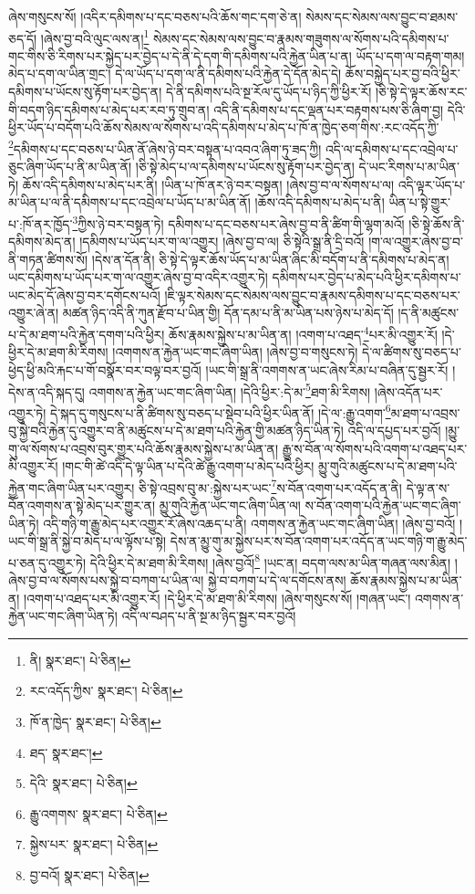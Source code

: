 ཞེས་གསུངས་སོ། །འདིར་དམིགས་པ་དང་བཅས་པའི་ཆོས་གང་དག་ཅེ་ན། སེམས་དང་སེམས་ལས་བྱུང་བ་ཐམས་ཅད་དོ། །ཞེས་བྱ་བའི་ལུང་ལས་ན།\footnote{ནི།  སྣར་ཐང་།  པེ་ཅིན། } སེམས་དང་སེམས་ལས་བྱུང་བ་རྣམས་གཟུགས་ལ་སོགས་པའི་དམིགས་པ་གང་གིས་ཅི་རིགས་པར་སྐྱེད་པར་བྱེད་པ་དེ་ནི་དེ་དག་གི་དམིགས་པའི་རྐྱེན་ཡིན་པ་ན། ཡོད་པ་དག་ལ་བརྟག་གམ། མེད་པ་དག་ལ་ཡིན་གྲང་། དེ་ལ་ཡོད་པ་དག་ལ་ནི་དམིགས་པའི་རྐྱེན་དེ་དོན་མེད་དེ། ཆོས་བསྐྱེད་པར་བྱ་བའི་ཕྱིར་དམིགས་པ་ཡོངས་སུ་རྟོག་པར་བྱེད་ན། དེ་ནི་དམིགས་པའི་སྔ་རོལ་དུ་ཡོད་པ་ཉིད་ཀྱི་ཕྱིར་རོ། །ཅི་སྟེ་དེ་ལྟར་ཆོས་རང་གི་བདག་ཉིད་དམིགས་པ་མེད་པར་རབ་ཏུ་གྲུབ་ན། འདི་ནི་དམིགས་པ་དང་ལྡན་པར་བརྟགས་པས་ཅི་ཞིག་བྱ། དེའི་ཕྱིར་ཡོད་པ་བདོག་པའི་ཆོས་སེམས་ལ་སོགས་པ་འདི་དམིགས་པ་མེད་པ་ཁོ་ན་ཁྱེད་ཅག་གིས་:རང་འདོད་ཀྱི་\footnote{རང་འདོད་ཀྱིས་  སྣར་ཐང་།  པེ་ཅིན། }དམིགས་པ་དང་བཅས་པ་ཡིན་ནོ་ཞེས་ཉེ་བར་བསྟན་པ་འབའ་ཞིག་ཏུ་ཟད་ཀྱི། འདི་ལ་དམིགས་པ་དང་འབྲེལ་པ་ཅུང་ཞིག་ཡོད་པ་ནི་མ་ཡིན་ནོ། །ཅི་སྟེ་མེད་པ་ལ་དམིགས་པ་ཡོངས་སུ་རྟོག་པར་བྱེད་ན། དེ་ཡང་རིགས་པ་མ་ཡིན་ཏེ། ཆོས་འདི་དམིགས་པ་མེད་པར་ནི། །ཡིན་པ་ཁོ་ནར་ཉེ་བར་བསྟན། །ཞེས་བྱ་བ་ལ་སོགས་པ་ལ། འདི་ལྟར་ཡོད་པ་མ་ཡིན་པ་ལ་ནི་དམིགས་པ་དང་འབྲེལ་པ་ཡོད་པ་མ་ཡིན་ནོ། །ཆོས་འདི་དམིགས་པ་མེད་པ་ནི། ཡིན་པ་སྟེ་གྱུར་པ་:ཁོ་ནར་ཁྱོད་\footnote{ཁོ་ན་ཁྱེད་  སྣར་ཐང་།  པེ་ཅིན། }ཀྱིས་ཉེ་བར་བསྟན་ཏེ། དམིགས་པ་དང་བཅས་པར་ཞེས་བྱ་བ་ནི་ཚིག་གི་ལྷག་མའོ། །ཅི་སྟེ་ཆོས་ནི་དམིགས་མེད་ན། །དམིགས་པ་ཡོད་པར་ག་ལ་འགྱུར། །ཞེས་བྱ་བ་ལ། ཅི་སྟེའི་སྒྲ་ནི་དྲི་བའོ། །ག་ལ་འགྱུར་ཞེས་བྱ་བ་ནི་གཏན་ཚིགས་སོ། །དེས་ན་དོན་ནི། ཅི་སྟེ་དེ་ལྟར་ཆོས་ཡོད་པ་མ་ཡིན་ཞིང་མི་བདོག་པ་ནི་དམིགས་པ་མེད་ན། ཡང་དམིགས་པ་ཡོད་པར་ག་ལ་འགྱུར་ཞེས་བྱ་བ་འདིར་འགྱུར་ཏེ། དམིགས་པར་བྱེད་པ་མེད་པའི་ཕྱིར་དམིགས་པ་ཡང་མེད་དོ་ཞེས་བྱ་བར་དགོངས་པའོ། །ཇི་ལྟར་སེམས་དང་སེམས་ལས་བྱུང་བ་རྣམས་དམིགས་པ་དང་བཅས་པར་འགྱུར་ཞེ་ན། མཚན་ཉིད་འདི་ནི་ཀུན་རྫོབ་པ་ཡིན་གྱི། དོན་དམ་པ་ནི་མ་ཡིན་པས་ཉེས་པ་མེད་དོ། །ད་ནི་མཚུངས་པ་དེ་མ་ཐག་པའི་རྐྱེན་དགག་པའི་ཕྱིར། ཆོས་རྣམས་སྐྱེས་པ་མ་ཡིན་ན། །འགག་པ་འཐད་\footnote{ཐད་  སྣར་ཐང་། }པར་མི་འགྱུར་རོ། །དེ་ཕྱིར་དེ་མ་ཐག་མི་རིགས། །འགགས་ན་རྐྱེན་ཡང་གང་ཞིག་ཡིན། །ཞེས་བྱ་བ་གསུངས་ཏེ། དེ་ལ་ཚིགས་སུ་བཅད་པ་ཕྱེད་ཕྱི་མའི་རྐང་པ་གོ་བསྣོར་བར་བལྟ་བར་བྱའོ། །ཡང་གི་སྒྲ་ནི་འགགས་ན་ཡང་ཞེས་རིམ་པ་བཞིན་དུ་སྦྱར་རོ། །དེས་ན་འདི་སྐད་དུ། འགགས་ན་རྐྱེན་ཡང་གང་ཞིག་ཡིན། །དེའི་ཕྱིར་:དེ་མ་\footnote{དེའི་  སྣར་ཐང་།  པེ་ཅིན། }ཐག་མི་རིགས། །ཞེས་འདོན་པར་འགྱུར་ཏེ། དེ་སྐད་དུ་གསུངས་པ་ནི་ཚིགས་སུ་བཅད་པ་སྡེབ་པའི་ཕྱིར་ཡིན་ནོ། །དེ་ལ་:རྒྱུ་འགག་\footnote{རྒྱུ་འགགས་  སྣར་ཐང་།  པེ་ཅིན། }མ་ཐག་པ་འབྲས་བུ་སྐྱེ་བའི་རྐྱེན་དུ་འགྱུར་བ་ནི་མཚུངས་པ་དེ་མ་ཐག་པའི་རྐྱེན་གྱི་མཚན་ཉིད་ཡིན་ཏེ། འདི་ལ་དཔྱད་པར་བྱའོ། །མྱུ་གུ་ལ་སོགས་པ་འབྲས་བུར་གྱུར་པའི་ཆོས་རྣམས་སྐྱེས་པ་མ་ཡིན་ན། རྒྱུ་ས་བོན་ལ་སོགས་པའི་འགག་པ་འཐད་པར་མི་འགྱུར་རོ། །གང་གི་ཚེ་འདི་དེ་ལྟ་ཡིན་པ་དེའི་ཚེ་རྒྱུ་འགག་པ་མེད་པའི་ཕྱིར། མྱུ་གུའི་མཚུངས་པ་དེ་མ་ཐག་པའི་རྐྱེན་གང་ཞིག་ཡིན་པར་འགྱུར། ཅི་སྟེ་འབྲས་བུ་མ་:སྐྱེས་པར་ཡང་\footnote{སྐྱེས་པར་  སྣར་ཐང་།  པེ་ཅིན། }ས་བོན་འགག་པར་འདོད་ན་ནི། དེ་ལྟ་ན་ས་བོན་འགགས་ན་སྟེ་མེད་པར་གྱུར་ན། མྱུ་གུའི་རྐྱེན་ཡང་གང་ཞིག་ཡིན་ལ། ས་བོན་འགག་པའི་རྐྱེན་ཡང་གང་ཞིག་ཡིན་ཏེ། འདི་གཉི་ག་རྒྱུ་མེད་པར་འགྱུར་རོ་ཞེས་འཆད་པ་ནི། འགགས་ན་རྐྱེན་ཡང་གང་ཞིག་ཡིན། །ཞེས་བྱ་བའོ། །ཡང་གི་སྒྲ་ནི་སྐྱེ་བ་མེད་པ་ལ་ལྟོས་པ་སྟེ། དེས་ན་མྱུ་གུ་མ་སྐྱེས་པར་ས་བོན་འགག་པར་འདོད་ན་ཡང་གཉི་ག་རྒྱུ་མེད་པ་ཅན་དུ་འགྱུར་ཏེ། དེའི་ཕྱིར་དེ་མ་ཐག་མི་རིགས། །ཞེས་བྱའོ།\footnote{བྱ་བའོ།  སྣར་ཐང་།  པེ་ཅིན། } །ཡང་ན། བདག་ལས་མ་ཡིན་གཞན་ལས་མིན། །ཞེས་བྱ་བ་ལ་སོགས་པས་སྐྱེ་བ་བཀག་པ་ཡིན་ལ། སྐྱེ་བ་བཀག་པ་དེ་ལ་དགོངས་ནས། ཆོས་རྣམས་སྐྱེས་པ་མ་ཡིན་ན། །འགག་པ་འཐད་པར་མི་འགྱུར་རོ། །དེ་ཕྱིར་དེ་མ་ཐག་མི་རིགས། །ཞེས་གསུངས་སོ། །གཞན་ཡང་། འགགས་ན་རྐྱེན་ཡང་གང་ཞིག་ཡིན་ཏེ། འདི་ལ་བཤད་པ་ནི་སྔ་མ་ཉིད་སྦྱར་བར་བྱའོ། 